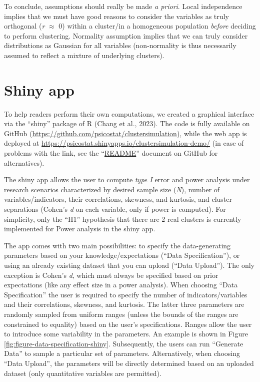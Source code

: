\documentclass[
  man,floatsintext]{apa7}
\begin{document}
To conclude, assumptions should really be made \emph{a priori}. Local independence implies that we must have good reasons to consider the variables as truly orthogonal (\emph{r} \(\approx\) 0) within a cluster/in a homogeneous population \emph{before} deciding to perform clustering. Normality assumption implies that we can truly consider distributions as Gaussian for all variables (non-normality is thus necessarily assumed to reflect a mixture of underlying clusters).

\hypertarget{shiny-app}{%
\section{Shiny app}\label{shiny-app}}

To help readers perform their own computations, we created a graphical interface via the ``shiny'' package of R (Chang et al., 2023). The code is fully available on GitHub (\url{https://github.com/psicostat/clustersimulation}), while the web app is deployed at \url{https://psicostat.shinyapps.io/clustersimulation-demo/} (in case of problems with the link, see the ``\href{https://github.com/psicostat/clustersimulation\#readme}{README}'' document on GitHub for alternatives).

The shiny app allows the user to compute \emph{type I} error and power analysis under research scenarios characterized by desired sample size (\emph{N}), number of variables/indicators, their correlations, skewness, and kurtosis, and cluster separations (Cohen's \emph{d} on each variable, only if power is computed). For simplicity, only the ``H1'' hypothesis that there are 2 real clusters is currently implemented for Power analysis in the shiny app.

The app comes with two main possibilities: to specify the data-generating parameters based on your knowledge/expectations (``Data Specification''), or using an already existing dataset that you can upload (``Data Upload''). The only exception is Cohen's \emph{d}, which must always be specified based on prior expectations (like any effect size in a power analysis). When choosing ``Data Specification'' the user is required to specify the number of indicators/variables and their correlations, skewness, and kurtosis. The latter three parameters are randomly sampled from uniform ranges (unless the bounds of the ranges are constrained to equality) based on the user's specifications. Ranges allow the user to introduce some variability in the parameters. An example is shown in Figure \ref{fig:figure-data-specification-shiny}. Subsequently, the users can run ``Generate Data'' to sample a particular set of parameters. Alternatively, when choosing ``Data Upload'', the parameters will be directly determined based on an uploaded dataset (only quantitative variables are permitted).
\end{document}
